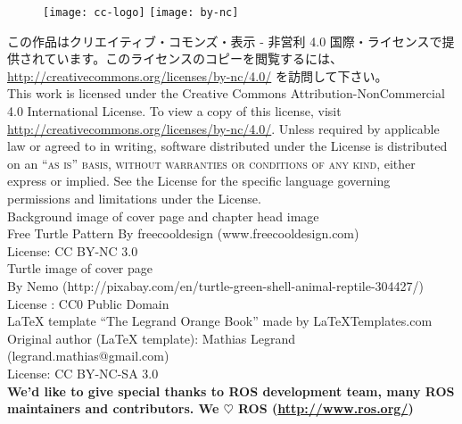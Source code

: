 \documentclass[11pt,fleqn]{book} %
\begin{document}
\begin{figure}[htp]
\centering
\texttt{[image: cc-logo]}
\hspace{10pt}
\texttt{[image: by-nc]}
\end{figure}

\noindent この作品はクリエイティブ・コモンズ・表示 - 非営利 4.0 国際・ライセンスで提供されています。このライセンスのコピーを閲覧するには、 \url{http://creativecommons.org/licenses/by-nc/4.0/} を訪問して下さい。\\

\noindent This work is licensed under the Creative Commons Attribution-NonCommercial 4.0 International License. To view a copy of this license, visit \url{http://creativecommons.org/licenses/by-nc/4.0/}. Unless required by applicable law or agreed to in writing, software distributed under the License is distributed on an \textsc{``as is'' basis, without warranties or conditions of any kind}, either express or implied. See the License for the specific language governing permissions and limitations under the License.\\ %

\noindent Background image of cover page and chapter head image\\
Free Turtle Pattern By freecooldesign (www.freecooldesign.com)\\
License: CC BY-NC 3.0\\

\noindent Turtle image of cover page\\
By Nemo (http://pixabay.com/en/turtle-green-shell-animal-reptile-304427/)\\
License : CC0 Public Domain\\

\noindent LaTeX template ``The Legrand Orange Book'' made by LaTeXTemplates.com\\
Original author (LaTeX template): Mathias Legrand (legrand.mathias@gmail.com)\\
License: CC BY-NC-SA 3.0\\

\noindent \textbf{We'd like to give special thanks to ROS development team, many ROS maintainers and contributors. We $\heartsuit$ ROS (\url{http://www.ros.org/})}

\newpage
\thispagestyle{empty}
\end{document}
